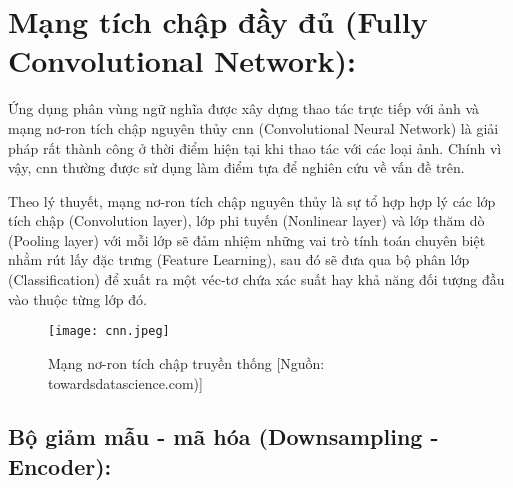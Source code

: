 \documentclass[../the.tex]{subfiles}
\begin{document}
\section{Mạng tích chập đầy đủ (Fully Convolutional Network):}
\label{sec:fcn}

{\fontsize{13}{12} \selectfont
Ứng dụng phân vùng ngữ nghĩa được xây dựng thao tác trực tiếp với ảnh và mạng nơ-ron tích chập nguyên thủy \gls{cnn} (Convolutional Neural Network) là giải pháp rất thành công ở thời điểm hiện tại khi thao tác với các loại ảnh. Chính vì vậy, \gls{cnn} thường được sử dụng làm điểm tựa để nghiên cứu về vấn đề trên.}

{\fontsize{13}{12} \selectfont
Theo lý thuyết, mạng nơ-ron tích chập nguyên thủy \cite{NIPS2012_4824} là sự tổ hợp hợp lý các lớp tích chập (Convolution layer), lớp phi tuyến (Nonlinear layer) và lớp thăm dò (Pooling layer) với mỗi lớp sẽ đảm nhiệm những vai trò tính toán chuyên biệt nhằm rút lấy đặc trưng (Feature Learning), sau đó sẽ đưa qua bộ phân lớp (Classification) để xuất ra một véc-tơ chứa xác suất hay khả năng đối tượng đầu vào thuộc từng lớp đó. }

\bigskip

{\fontsize{13}{12} \selectfont
\begin{figure}[H]
\centering
	\texttt{[image: cnn.jpeg]}
	\caption{Mạng nơ-ron tích chập truyền thống [Nguồn: towardsdatascience.com)]}
	\label{fig:cnn_traditional}
\end{figure}}
\bigskip
\bigskip


\subsection{Bộ giảm mẫu - mã hóa (Downsampling - Encoder):}
\label{sec:encoder}
\end{document}
